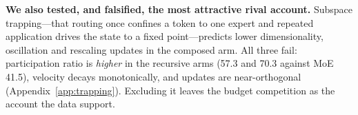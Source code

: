 \textbf{We also tested, and falsified, the most attractive rival account.} Subspace trapping---that routing once confines a token to one expert and repeated application drives the state to a fixed point---predicts lower dimensionality, oscillation and rescaling updates in the composed arm. All three fail: participation ratio is \emph{higher} in the recursive arms (57.3 and 70.3 against MoE 41.5), velocity decays monotonically, and updates are near-orthogonal (Appendix~\ref{app:trapping}). Excluding it leaves the budget competition as the account the data support.

